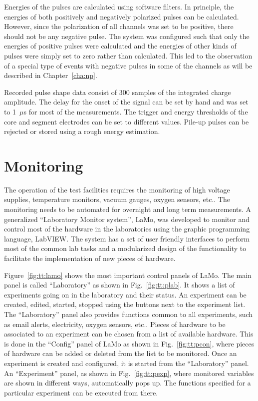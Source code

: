 Energies of the pulses are calculated using software filters. In
principle, the energies of both positively and negatively polarized
pulses can be calculated. However, since the polarization of all
channels was set to be positive, there should not be any negative
pulse. The system was configured such that only the energies of
positive pulses were calculated and the energies of other kinds of
pulses were simply set to zero rather than calculated. This led to the
observation of a special type of events with negative pulses in some
of the channels as will be described in Chapter~\ref{cha:np}.

Recorded pulse shape data consist of 300 samples of the integrated
charge amplitude. The delay for the onset of the signal can be set by
hand and was set to 1~$\mu$s for most of the measurements. The trigger
and energy thresholds of the core and segment electrodes can be set to
different values. Pile-up pulses can be rejected or stored using a
rough energy estimation.


\section{Monitoring} 
\label{sec:tt:lamo}
The operation of the test facilities requires the monitoring of high
voltage supplies, temperature monitors, vacuum gauges, oxygen sensors,
etc.. The monitoring needs to be automated for overnight and long term
measurements. A generalized ``Laboratory Monitor system'', LaMo, was
developed to monitor and control most of the hardware in the
laboratories using the graphic programming language, LabVIEW. The
system has a set of user friendly interfaces to perform most of the
common lab tasks and a modularized design of the functionality to
facilitate the implementation of new pieces of hardware.

Figure~\ref{fig:tt:lamo} shows the most important control panels of
LaMo. The main panel is called ``Laboratory'' as shown in
Fig.~\ref{fig:tt:plab}. It shows a list of experiments going on in the
laboratory and their status. An experiment can be created, edited,
started, stopped using the buttons next to the experiment list. The
``Laboratory'' panel also provides functions common to all
experiments, such as email alerts, electricity, oxygen sensors,
etc.. Pieces of hardware to be associated to an experiment can be
chosen from a list of available hardware. This is done in the
``Config'' panel of LaMo as shown in Fig.~\ref{fig:tt:pcon}, where
pieces of hardware can be added or deleted from the list to be
monitored. Once an experiment is created and configured, it is started
from the ``Laboratory'' panel. An ``Experiment'' panel, as shown in
Fig.~\ref{fig:tt:pexp}, where monitored variables are shown in
different ways, automatically pops up. The functions specified for a
particular experiment can be executed from there.

